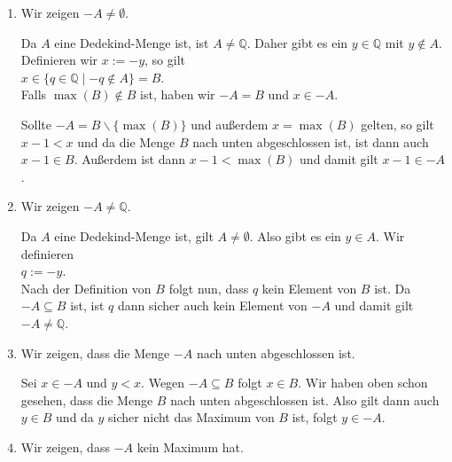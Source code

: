 \begin{enumerate}
\item Wir zeigen $-\!A \not= \emptyset$.

      Da $A$ eine Dedekind-Menge ist, ist $A \not= \mathbb{Q}$.  Daher gibt es ein $y \in \mathbb{Q}$ 
      mit $y \not\in A$.  Definieren wir $x := -y$, so gilt
      \\[0.2cm]
      \hspace*{1.3cm}
      $x \in \{ q \in \mathbb{Q} \mid -q \not\in A \} = B$.
      \\[0.2cm]
      Falls $\max(B) \not\in B$ ist, haben wir $-A = B$ und $x \in -A$.

      Sollte $-A = B \backslash \{ \max(B) \}$ und außerdem $x = \max(B)$ gelten, so gilt $x-1 < x$ und da die Menge $B$ nach unten
      abgeschlossen ist, ist dann auch $x-1 \in B$.  Außerdem ist dann  $x - 1 < \max(B)$ und damit
      gilt $x-1 \in -A$.
\item Wir zeigen $-\!A \not= \mathbb{Q}$.

      Da $A$ eine Dedekind-Menge ist, gilt $A \not= \emptyset$.  Also gibt es ein $y \in A$.
      Wir definieren
      \\[0.2cm]
      \hspace*{1.3cm}
      $q := -y$.
      \\[0.2cm]
      Nach der Definition von $B$ folgt nun, dass $q$ kein Element von $B$ ist.
      Da $-A \subseteq B$ ist, ist $q$ dann sicher auch kein Element von $-A$ und damit 
      gilt $-\!A \not= \mathbb{Q}$.
\item Wir zeigen, dass die Menge $-\!A$ nach unten abgeschlossen ist.
  
      Sei $x \in -A$ und $y < x$.  Wegen $-A \subseteq B$ folgt $x \in B$.
      Wir haben oben schon gesehen, dass die Menge $B$ nach unten abgeschlossen ist.
      Also gilt dann auch $y \in B$ und da $y$ sicher nicht das Maximum von $B$ ist, folgt 
      $y \in -A$.
\item Wir zeigen, dass $-\!A$ kein Maximum hat.


\end{enumerate}
